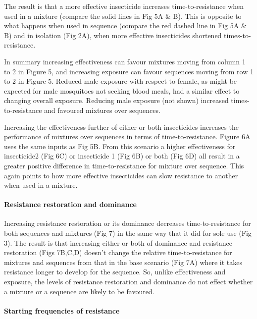 \documentclass[11pt,]{article}
\let\oldparagraph\paragraph
\renewcommand{\paragraph}[1]{\oldparagraph{#1}\mbox{}}
\begin{document}
The result is that a more effective insecticide increases
time-to-resistance when used in a mixture (compare the solid lines in
Fig 5A \& B). This is opposite to what happens when used in sequence
(compare the red dashed line in Fig 5A \& B) and in isolation (Fig 2A),
when more effective insecticides shortened times-to-resistance.

In summary increasing effectiveness can favour mixtures moving from
column 1 to 2 in Figure 5, and increasing exposure can favour sequences
moving from row 1 to 2 in Figure 5. Reduced male exposure with respect
to female, as might be expected for male mosquitoes not seeking blood
meals, had a similar effect to changing overall exposure. Reducing male
exposure (not shown) increased times-to-resistance and favoured mixtures
over sequences.

Increasing the effectiveness further of either or both insecticides
increases the performance of mixtures over sequences in terms of
time-to-resistance. Figure 6A uses the same inputs as Fig 5B. From this
scenario a higher effectiveness for insecticide2 (Fig 6C) or insecticide
1 (Fig 6B) or both (Fig 6D) all result in a greater positive difference
in time-to-resistance for mixture over sequence. This again points to
how more effective insecticides can slow resistance to another when used
in a mixture.

\paragraph{Resistance restoration and
dominance}\label{resistance-restoration-and-dominance}

Increasing resistance restoration or its dominance decreases
time-to-resistance for both sequences and mixtures (Fig 7) in the same
way that it did for sole use (Fig 3). The result is that increasing
either or both of dominance and resistance restoration (Figs 7B,C,D)
doesn't change the relative time-to-resistance for mixtures and
sequences from that in the base scenario (Fig 7A) where it takes
resistance longer to develop for the sequence. So, unlike effectiveness
and exposure, the levels of resistance restoration and dominance do not
effect whether a mixture or a sequence are likely to be favoured.

\paragraph{Starting frequencies of
resistance}\label{starting-frequencies-of-resistance}
\end{document}
